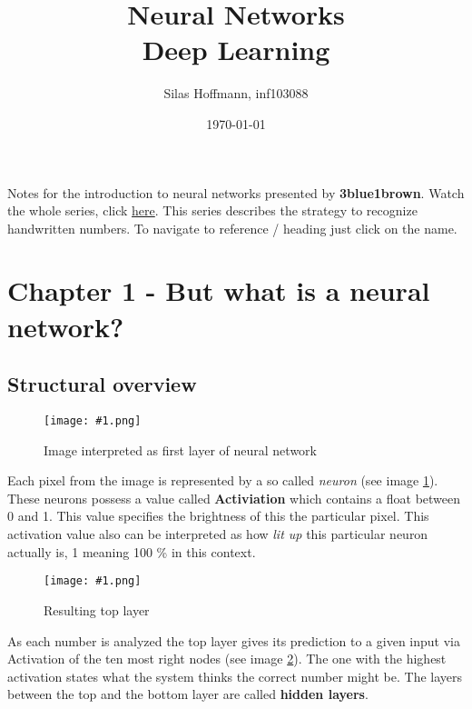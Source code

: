 \documentclass{article}
\title{%
Neural Networks \\
\large Deep Learning}
\author{Silas Hoffmann, inf103088}
\date{\today}
\newcommand{\lbl}[1]{(see image \ref{#1})}
\newcommand{\img}[1]{
	\centering
	\texttt{[image: \#1.png]}
	\label{#1}
}
\begin{document}
\maketitle

\vspace{0.5cm}
\tableofcontents
\vspace{1cm}

Notes for the introduction to neural networks presented by \textbf{3blue1brown}. Watch the whole series, click \href{https://www.youtube.com/watch?v=aircAruvnKk}{\color{blue} {here}}. This series describes the strategy to recognize handwritten numbers. To navigate to reference / heading just click on the name.

\listoffigures

\clearpage

\section{Chapter 1 - But what is a neural network?}


\subsection{Structural overview}

\FloatBarrier

\begin{figure}[h]
\img{ai_1}
\caption{Image interpreted as first layer of neural network}
\end{figure}

Each pixel from the image is represented by a so called \textit{neuron} \lbl{ai_1}. These neurons possess a value called \textbf{Activiation} which contains a float between 0 and 1. This value specifies the brightness of this the particular pixel. This activation value also can be interpreted as how \textit{lit up} this particular neuron actually is, 1 meaning 100 \% in this context.


\begin{figure}[b!]
\img{ai_2}
\caption{Resulting top layer}
\end{figure}

As each number is analyzed the top layer gives its prediction to a given input via Activation of the ten most right nodes \lbl{ai_2}. The one with the highest activation states what the system thinks the correct number might be. The layers between the top and the bottom layer are called \textbf{hidden layers}. 
\end{document}
